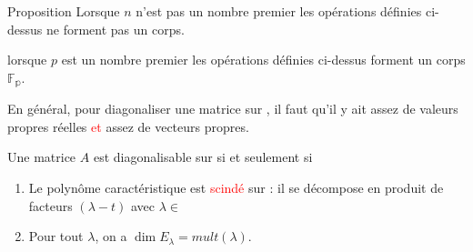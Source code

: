     \begin{theoreme}{Proposition}
        Lorsque $n$ n'est pas un nombre premier les opérations définies ci-dessus ne forment pas un corps.
    \end{theoreme}
\begin{theoreme}
    lorsque $p$ est un nombre premier les opérations définies ci-dessus forment un corps $\mathbb{F_p}$.
\end{theoreme}
    En général, pour diagonaliser une matrice sur \R, il faut qu'il y ait assez de valeurs propres réelles \textcolor{red}{et} assez de vecteurs propres.
    \begin{theoreme}
        Une matrice $A$ est diagonalisable sur \R si et seulement si 
        \begin{enumerate}
            \item Le polynôme caractéristique est \textcolor{red}{scindé} sur \R : il se décompose en produit de facteurs $(\lambda - t)$ avec $\lambda \in $ \R
            \item Pour tout $\lambda$, on a $\dim E_\lambda = mult(\lambda)$.
        \end{enumerate}
    \end{theoreme}
    

